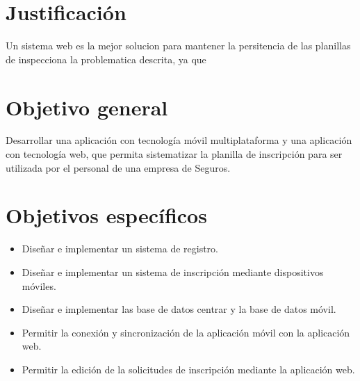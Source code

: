 \setlength{\parskip}{0mm}


\section{Justificación}


Un sistema web es la mejor solucion para mantener la persitencia de las planillas de inspecciona la problematica descrita, ya que 

\section{Objetivo general}

Desarrollar una aplicación con tecnología móvil multiplataforma y una aplicación con tecnología web, que permita sistematizar la planilla de inscripción para ser utilizada por el personal de una empresa de Seguros. 

\section{Objetivos específicos}

\begin{itemize}

	\item Diseñar e implementar un sistema de registro.
	
	\item Diseñar e implementar un sistema de inscripción mediante dispositivos móviles.
	
	\item Diseñar e implementar las base de datos centrar y la base de datos móvil.
	
	\item Permitir la conexión y sincronización de la aplicación móvil con la aplicación web.
	
	\item Permitir la edición de la solicitudes de inscripción mediante la aplicación web.
	
	

\end{itemize}



